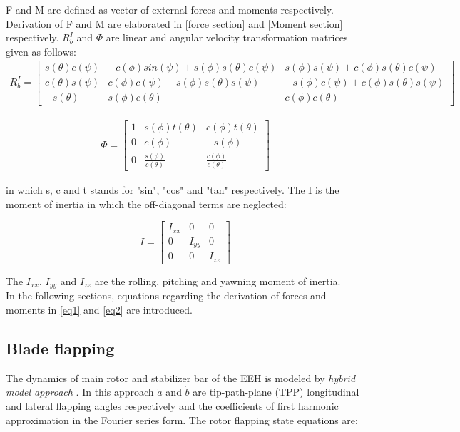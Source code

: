F and M are defined as vector of external forces and moments respectively. Derivation of F and M are elaborated in \ref{force section} and \ref{Moment section} respectively. $R_b^I$ and $\Phi$ are linear and angular velocity transformation matrices given as follows: 
\begin{gather}
	R_b^I
	=
	\begin{bmatrix}
		s(\theta)c(\psi) &
		-c(\phi)sin(\psi)+s(\phi)s(\theta)c(\psi)&
		s(\phi)s(\psi)+c(\phi)s(\theta)c(\psi) \\
		c(\theta)s(\psi) &
		c(\phi)c(\psi)+s(\phi)s(\theta)s(\psi)&
		-s(\phi)c(\psi)+c(\phi)s(\theta)s(\psi)\\
		-s(\theta)&
		s(\phi)c(\theta)&
		c(\phi)c(\theta)
	\end{bmatrix}
\end{gather}

\begin{gather}
	\Phi
	=
	\begin{bmatrix}
		1 &
		s(\phi)t(\theta)&
		c(\phi)t(\theta) \\
		0 &
		c(\phi)&
		-s(\phi)\\
		0&
		\frac{s(\phi)}{c(\theta)} &
		\frac{c(\phi)}{c(\theta)}
	\end{bmatrix}
\end{gather}

in which s, c and t stands for "sin", "cos" and "tan" respectively.
The I is the moment of inertia in which the off-diagonal terms are neglected:

\begin{equation}
	I=
	\begin{bmatrix}
		I_{xx} &
		0&
		0 \\
		0 &
		I_{yy}&
		0\\
		0&
		0&
		I_{zz}
	\end{bmatrix}
\end{equation}

The $I_{xx}$, $I_{yy}$ and $I_{zz}$ are the rolling, pitching and yawning moment of inertia.\\

In the following sections, equations regarding the derivation of forces and moments in \ref{eq1} and \ref{eq2} are introduced.
\subsection{Blade flapping}

The dynamics of main rotor and stabilizer bar of the EEH is modeled by \textit{hybrid model approach} \cite{mettler2002system}. In this approach $\dot{a}$ and $\dot{b}$ are  tip-path-plane (TPP) longitudinal and lateral flapping angles respectively and the coefficients of first harmonic approximation in the Fourier series form. The rotor flapping state equations are:

